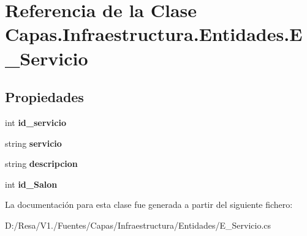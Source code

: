 \section{Referencia de la Clase Capas.\+Infraestructura.\+Entidades.\+E\+\_\+\+Servicio}
\label{class_capas_1_1_infraestructura_1_1_entidades_1_1_e___servicio}
\subsection*{Propiedades}
\begin{DoxyCompactItemize}
\item 
int {\bfseries id\+\_\+servicio}\hspace{0.3cm}{\ttfamily  [get, set]}\label{class_capas_1_1_infraestructura_1_1_entidades_1_1_e___servicio_ac72759df3b0e437f71ca0d319c6c1d74}

\item 
string {\bfseries servicio}\hspace{0.3cm}{\ttfamily  [get, set]}\label{class_capas_1_1_infraestructura_1_1_entidades_1_1_e___servicio_a7e5514c2a96b12eace65ab2277b7b288}

\item 
string {\bfseries descripcion}\hspace{0.3cm}{\ttfamily  [get, set]}\label{class_capas_1_1_infraestructura_1_1_entidades_1_1_e___servicio_a8c9cf754c65861125dd501f6c1772532}

\item 
int {\bfseries id\+\_\+\+Salon}\hspace{0.3cm}{\ttfamily  [get, set]}\label{class_capas_1_1_infraestructura_1_1_entidades_1_1_e___servicio_abf0fe493f0a89addbbf81a9d20c7c184}

\end{DoxyCompactItemize}


La documentación para esta clase fue generada a partir del siguiente fichero\+:\begin{DoxyCompactItemize}
\item 
D\+:/\+Resa/\+V1./\+Fuentes/\+Capas/\+Infraestructura/\+Entidades/E\+\_\+\+Servicio.\+cs\end{DoxyCompactItemize}
